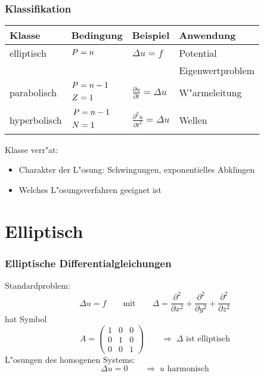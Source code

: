 \documentclass{beamer}
\begin{document}
\begin{frame}
\frametitle{Klassifikation}

\begin{center}
\begin{tabular}{llll}
Klasse&Bedingung&Beispiel&Anwendung\\
\hline
elliptisch &$\begin{aligned}P&=n\mathstrut\end{aligned}$
	&$\displaystyle \Delta u=f                                $
		&Potential\\
&	&	&Eigenwertproblem\\
\hline
parabolisch&%
$\begin{aligned}P&=n-1\mathstrut\\Z&=1\mathstrut\end{aligned}$
	&$\displaystyle \frac{\partial u}{\partial t}=\Delta u    $
		&W"armeleitung\\
\hline
hyperbolisch&%
$\begin{aligned}P&=n-1\mathstrut\\N&=1\mathstrut\end{aligned}$
	&$\displaystyle \frac{\partial^2 u}{\partial t^2}=\Delta u$
		&Wellen\\
\hline
\end{tabular}
\end{center}

Klasse verr"at:
\begin{itemize}
\item Charakter der L"osung: Schwingungen, exponentielles Abklingen
\item Welches L"osungsverfahren geeignet ist
\end{itemize}

\end{frame}

\section{Elliptisch}

\begin{frame}
\frametitle{Elliptische Differentialgleichungen}
Standardproblem:
\[
\Delta u = f
\qquad\text{mit}\qquad
\Delta 
=
\frac{\partial^2}{\partial x^2}
+
\frac{\partial^2}{\partial y^2}
+
\frac{\partial^2}{\partial z^2}
\]
hat Symbol
\[
A=\begin{pmatrix}1&0&0\\0&1&0\\0&0&1\end{pmatrix}
\qquad
\Rightarrow
\;
\text{$\Delta$ ist elliptisch}
\]
L"osungen des homogenen Systems:
\[
\Delta u=0
\qquad\Rightarrow\;
\text{$u$ harmonisch}
\]
\end{frame}
\end{document}
